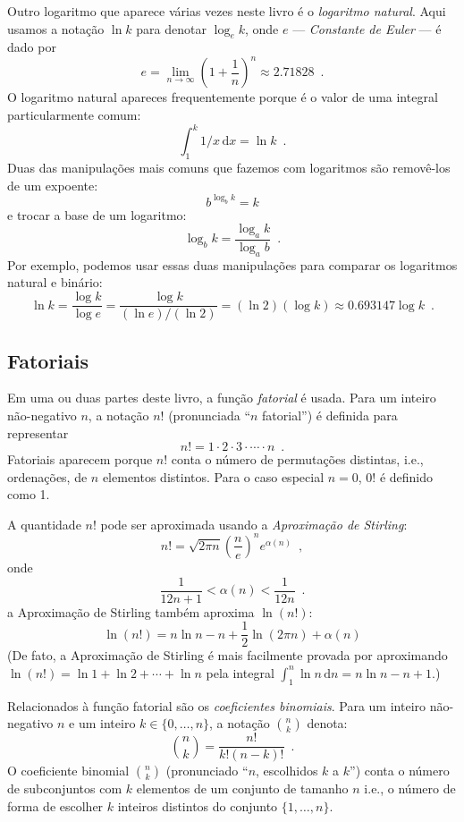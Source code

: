 %
%
Outro logaritmo que aparece várias vezes neste livro é o 
\emph{logaritmo natural}. Aqui usamos a notação $\ln k$ para denotar 
$\log_e k$, onde $e$ --- \emph{Constante de Euler} --- é dado por 
%
%
\[
   e = \lim_{n\rightarrow\infty} \left(1+\frac{1}{n}\right)^n
   \approx  2.71828 \enspace .
\]
O logaritmo natural apareces frequentemente porque é o valor
de uma integral particularmente comum:
\[
    \int_{1}^{k} 1/x\,\mathrm{d}x  = \ln k \enspace .
\]
Duas das manipulações mais comuns que fazemos com logaritmos são
removê-los de um expoente:
\[
    b^{\log_b k} = k
\]
e trocar a base de um logaritmo:
\[
    \log_b k = \frac{\log_a k}{\log_a b} \enspace .
\]
Por exemplo, podemos usar essas duas manipulações para comparar os logaritmos natural e binário:
\[
   \ln k = \frac{\log k}{\log e} = \frac{\log k}{(\ln e)/(\ln 2)} = 
    (\ln 2)(\log k) \approx 0.693147\log k \enspace .
\]

\subsection{Fatoriais}

%
Em uma ou duas partes deste livro,
a função \emph{fatorial} é usada.
Para um inteiro não-negativo $n$, a notação $n!$ (pronunciada ``$n$ fatorial'') é definida para representar 
\[
   n! = 1\cdot2\cdot3\cdot\cdots\cdot n \enspace .
\]
Fatoriais aparecem porque $n!$ conta o número de permutações distintas, i.e., ordenações, de $n$ elementos distintos. 
%
Para o caso especial $n=0$, $0!$  é definido como 1. 

%
A quantidade $n!$ pode ser aproximada usando a \emph{Aproximação de Stirling}:
\[
	n! 
   = \sqrt{2\pi n}\left(\frac{n}{e}\right)^{n}e^{\alpha(n)} \enspace ,
\]
onde
\[  
   \frac{1}{12n+1} <  \alpha(n) < \frac{1}{12n}  \enspace .
\]
a Aproximação de Stirling também aproxima $\ln(n!)$:
\[
   \ln(n!) = n\ln n - n + \frac{1}{2}\ln(2\pi n) + \alpha(n)
\]
(De fato, a Aproximação de Stirling é mais facilmente provada por aproximando
$\ln(n!)=\ln 1 + \ln 2  + \cdots + \ln n$ pela integral
$\int_1^n \ln n\,\mathrm{d}n = n\ln n - n +1$.)

%
Relacionados à função fatorial são os 
\emph{coeficientes binomiais}.
Para um inteiro não-negativo $n$ e um inteiro $k\in\{0,\ldots,n\}$,
a notação $\binom{n}{k}$ denota:
\[
   \binom{n}{k} = \frac{n!}{k!(n-k)!} \enspace .
\]
O coeficiente binomial
 $\binom{n}{k}$ (pronunciado ``$n$, escolhidos $k$ a $k$'')
 conta o número de subconjuntos com $k$ elementos de um conjunto de tamanho $n$ 
i.e., o número de forma de escolher $k$ inteiros distintos do conjunto $\{1,\ldots,n\}$.

